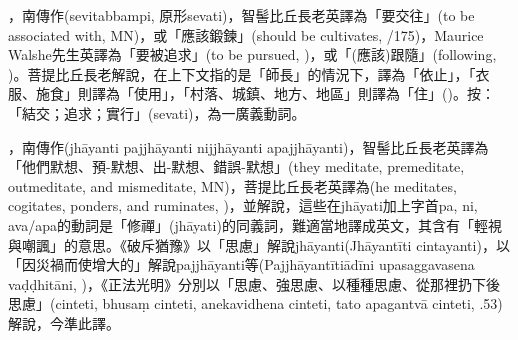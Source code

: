 \startitemgroup[noteitems]
\item{}，南傳作(sevitabbampi, 原形sevati)，智髻比丘長老英譯為「要交往」(to be associated with, MN)，或「應該鍛鍊」(should be cultivates, /175)，Maurice Walshe先生英譯為「要被追求」(to be pursued, )，或「(應該)跟隨」(following, )。菩提比丘長老解說，在上下文指的是「師長」的情況下，譯為「依止」，「衣服、施食」則譯為「使用」，「村落、城鎮、地方、地區」則譯為「住」()。按：「結交；追求；實行」(sevati)，為一廣義動詞。
\stopitemgroup

\startitemgroup[noteitems]
\item{}，南傳作(jhāyanti pajjhāyanti nijjhāyanti apajjhāyanti)，智髻比丘長老英譯為「他們默想、預-默想、出-默想、錯誤-默想」(they meditate, premeditate, outmeditate, and mismeditate, MN)，菩提比丘長老英譯為(he meditates, cogitates, ponders, and ruminates, )，並解說，這些在jhāyati加上字首pa, ni, ava/apa的動詞是「修禪」(jhāyati)的同義詞，難適當地譯成英文，其含有「輕視與嘲諷」的意思。《破斥猶豫》以「思慮」解說jhāyanti(Jhāyantīti cintayanti)，以「因災禍而使增大的」解說pajjhāyanti等(Pajjhāyantītiādīni upasaggavasena vaḍḍhitāni, )，《正法光明》分別以「思慮、強思慮、以種種思慮、從那裡扔下後思慮」(cinteti, bhusaṃ cinteti, anekavidhena cinteti, tato apagantvā cinteti, .53)解說，今準此譯。
\stopitemgroup

